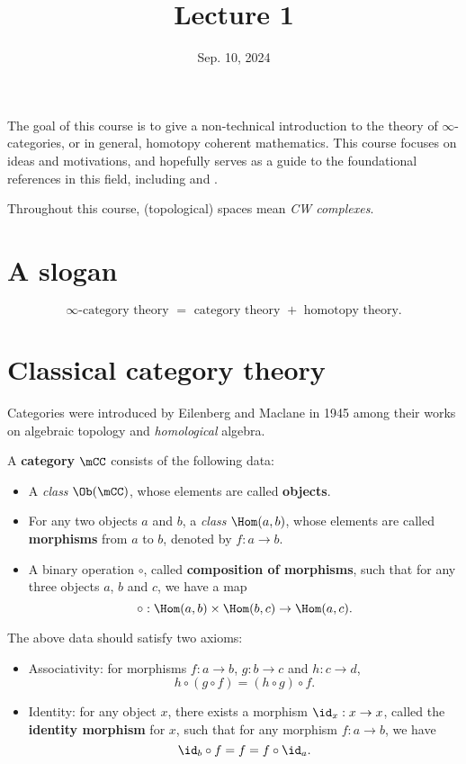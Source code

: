 





\title{Lecture 1}

\date{Sep. 10, 2024}

\maketitle

The goal of this course is to give a non-technical introduction to the theory of $\infty$-categories, or in general, homotopy coherent mathematics. This course focuses on ideas and motivations, and hopefully serves as a guide to the foundational references in this field, including \cite{HTT} and \cite{HA}.

\medskip

Throughout this course, (topological) spaces mean \emph{CW complexes}.

\section{A slogan}

\begin{slog}
	\[
		\infty\textrm{-category theory }=\textrm{ category theory }+\textrm{ homotopy theory}.
	\]
\end{slog}

\section{Classical category theory}

\ssec{}

Categories were introduced by Eilenberg and Maclane in 1945 among their works on algebraic topology and \emph{homological} algebra. 

\begin{defn}
	A \textbf{category} $\mCC$ consists of the following data:
	\begin{itemize}
		\item 
			A \emph{class} $\Ob(\mCC)$, whose elements are called \textbf{objects}.
		\item
			For any two objects $a$ and $b$, a \emph{class} $\Hom(a,b)$, whose elements are called \textbf{morphisms} from $a$ to $b$, denoted by $f:a\to b$.
		\item
			A binary operation $\circ$, called \textbf{composition of morphisms}, such that for any three objects $a$, $b$ and $c$, we have a map
			\[
				\circ: \Hom(a,b) \mt \Hom(b,c) \to \Hom(a,c).
			\]
	\end{itemize}
	The above data should satisfy two axioms:
	\begin{itemize}
		\item 
			Associativity: for morphisms $f:a\to b$, $g: b\to c$ and $h:c\to d$,
			\[
				h\circ (g\circ f) = (h\circ g) \circ f.
			\]
		\item
			Identity: for any object $x$, there exists a morphism $\id_x: x\to x$, called the \textbf{identity morphism} for $x$, such that for any morphism $f:a\to b$, we have
			\[
				\id_b\circ f = f = f\circ \id_a.
			\]
	\end{itemize}
\end{defn}

